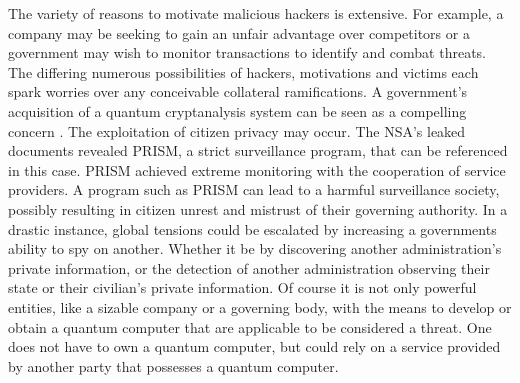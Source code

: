 The variety of reasons to motivate malicious hackers is extensive. For example, a company may be seeking to gain an unfair advantage over competitors or a government may wish to monitor transactions to identify and combat threats. The differing numerous possibilities of hackers, motivations and victims each spark worries over any conceivable collateral ramifications. A government's acquisition of a quantum cryptanalysis system can be seen as a compelling concern \cite{Sec_Risk}. The exploitation of citizen privacy may occur. The NSA's leaked documents revealed PRISM, a strict surveillance program, that can be referenced in this case. PRISM achieved extreme monitoring with the cooperation of service providers. A program such as PRISM can lead to a harmful surveillance society, possibly resulting in citizen unrest and mistrust of their governing authority. In a drastic instance, global tensions could be escalated by increasing a governments ability to spy on another. Whether it be by discovering another administration's private information, or the detection of another administration observing their state or their civilian's private information. 
Of course it is not only powerful entities, like a sizable company or a governing body, with the means to develop or obtain a quantum computer that are applicable to be considered a threat. One does not have to own a quantum computer, but could rely on a service provided by another party that possesses a quantum computer. 
